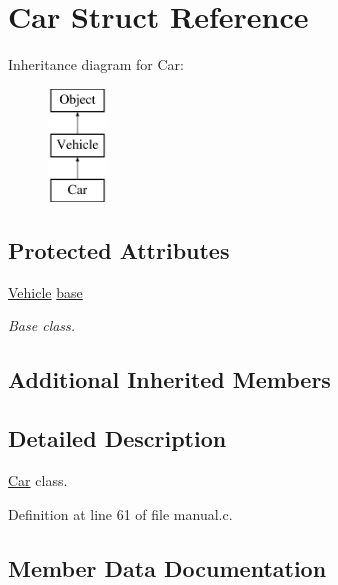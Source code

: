 \hypertarget{struct_car}{}\section{Car Struct Reference}
\label{struct_car}
Inheritance diagram for Car\+:\begin{figure}[H]
\begin{center}
\leavevmode
\includegraphics[height=3.000000cm]{struct_car}
\end{center}
\end{figure}
\subsection*{Protected Attributes}
\begin{DoxyCompactItemize}
\item 
\mbox{\hyperlink{struct_vehicle}{Vehicle}} \mbox{\hyperlink{struct_car_ab8ff28306286da5a8b14fa9bdccaafaa}{base}}
\begin{DoxyCompactList}\small\item\em Base class. \end{DoxyCompactList}\end{DoxyCompactItemize}
\subsection*{Additional Inherited Members}


\subsection{Detailed Description}
\mbox{\hyperlink{struct_car}{Car}} class. 

Definition at line 61 of file manual.\+c.



\subsection{Member Data Documentation}
\mbox{\label{struct_car_ab8ff28306286da5a8b14fa9bdccaafaa}} 
